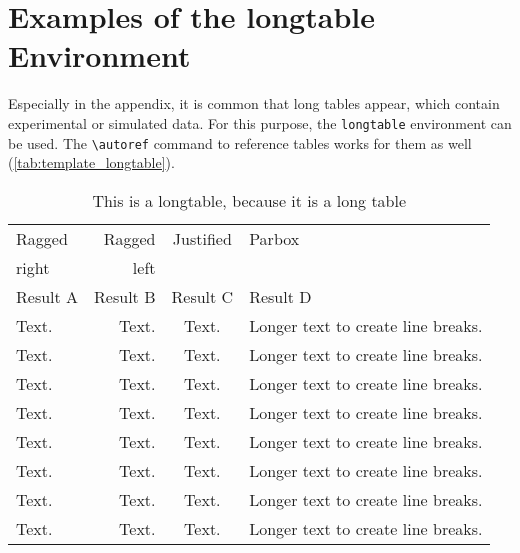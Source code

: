 \chapter{Examples of the longtable Environment}\label{app:longtable}
Especially in the appendix, it is common that long tables appear, which contain experimental or simulated data. For this purpose, the \verb+longtable+ environment can be used. The \verb+\autoref+ command to reference tables works for them as well (\autoref{tab:template_longtable}).
 \begin{longtable}{lrcp{2cm}}
  \caption[Name appearing in the List of Tables]{This is a longtable, because it is a long table}\label{tab:template_longtable}\\
 \toprule
 Ragged&Ragged&Justified&Parbox\\
 right&left&&\\ 
 Result A&Result B&Result C&Result D\\
 \midrule
 Text.&Text.&Text.&Longer text to create line breaks.\\
 Text.&Text.&Text.&Longer text to create line breaks.\\
 Text.&Text.&Text.&Longer text to create line breaks.\\
 Text.&Text.&Text.&Longer text to create line breaks.\\
 Text.&Text.&Text.&Longer text to create line breaks.\\
 Text.&Text.&Text.&Longer text to create line breaks.\\
 Text.&Text.&Text.&Longer text to create line breaks.\\
 Text.&Text.&Text.&Longer text to create line breaks.\\ 
\bottomrule
 \end{longtable}
 
